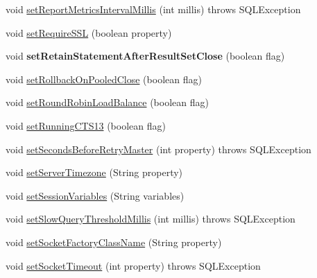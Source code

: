 \begin{DoxyCompactItemize}
\item 
void \mbox{\hyperlink{classcom_1_1mysql_1_1jdbc_1_1_connection_properties_impl_a828b72738e8e0e97d4695d6ac5c7c578}{set\+Report\+Metrics\+Interval\+Millis}} (int millis)  throws S\+Q\+L\+Exception 
\item 
void \mbox{\hyperlink{classcom_1_1mysql_1_1jdbc_1_1_connection_properties_impl_a7a7fd30f253879012fa5f2b7814cd33c}{set\+Require\+S\+SL}} (boolean property)
\item 
\mbox{\label{classcom_1_1mysql_1_1jdbc_1_1_connection_properties_impl_aecef6f122541cf3945d697c0a2f3a116}} 
void {\bfseries set\+Retain\+Statement\+After\+Result\+Set\+Close} (boolean flag)
\item 
void \mbox{\hyperlink{classcom_1_1mysql_1_1jdbc_1_1_connection_properties_impl_a187ec03b36f50445fb240336726772e6}{set\+Rollback\+On\+Pooled\+Close}} (boolean flag)
\item 
void \mbox{\hyperlink{classcom_1_1mysql_1_1jdbc_1_1_connection_properties_impl_ab6219b2405e2a9b5aae85fafacead1da}{set\+Round\+Robin\+Load\+Balance}} (boolean flag)
\item 
void \mbox{\hyperlink{classcom_1_1mysql_1_1jdbc_1_1_connection_properties_impl_abf878845b942c7f66f05ba71c9075663}{set\+Running\+C\+T\+S13}} (boolean flag)
\item 
void \mbox{\hyperlink{classcom_1_1mysql_1_1jdbc_1_1_connection_properties_impl_a9d8785362f5a7c1519ab5f3dd67bc8f3}{set\+Seconds\+Before\+Retry\+Master}} (int property)  throws S\+Q\+L\+Exception 
\item 
void \mbox{\hyperlink{classcom_1_1mysql_1_1jdbc_1_1_connection_properties_impl_a41603562941daa36f6b6616896698088}{set\+Server\+Timezone}} (String property)
\item 
void \mbox{\hyperlink{classcom_1_1mysql_1_1jdbc_1_1_connection_properties_impl_ab45209f886ce9eaa0ad7134674db924e}{set\+Session\+Variables}} (String variables)
\item 
void \mbox{\hyperlink{classcom_1_1mysql_1_1jdbc_1_1_connection_properties_impl_a32694f0aad4b653be6c209d729576e60}{set\+Slow\+Query\+Threshold\+Millis}} (int millis)  throws S\+Q\+L\+Exception 
\item 
void \mbox{\hyperlink{classcom_1_1mysql_1_1jdbc_1_1_connection_properties_impl_ad6b6ec74d81a6683a56f915860a465ed}{set\+Socket\+Factory\+Class\+Name}} (String property)
\item 
void \mbox{\hyperlink{classcom_1_1mysql_1_1jdbc_1_1_connection_properties_impl_a6637b8eae4c2a599f7a5925e812fa4df}{set\+Socket\+Timeout}} (int property)  throws S\+Q\+L\+Exception 

\end{DoxyCompactItemize}
